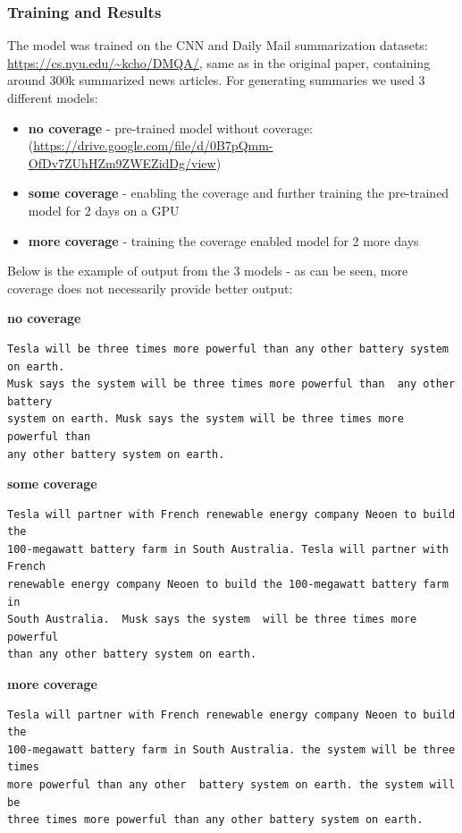 \documentclass[12pt,a4paper]{article}
\begin{document}
\subsubsection{Training and Results}

The model was trained on the CNN and Daily Mail summarization datasets: \\ \mbox{\url{https://cs.nyu.edu/~kcho/DMQA/}}, same as in the original paper, containing around 300k summarized news articles. For generating summaries we used 3 different models:
\begin{itemize}
\item \textbf{no coverage} - pre-trained model without coverage: \\(\mbox{\url{https://drive.google.com/file/d/0B7pQmm-OfDv7ZUhHZm9ZWEZidDg/view}})
\item \textbf{some coverage} - enabling the coverage and further training the pre-trained model for 2 days on a GPU 
\item \textbf{more coverage} - training the coverage enabled model for 2 more days 
\end{itemize}

Below is the example of output from the 3 models - as can be seen, more coverage does not necessarily provide better output: \hfill \break

\textbf{no coverage}

\begin{verbatim}
Tesla will be three times more powerful than any other battery system on earth.  
Musk says the system will be three times more powerful than  any other battery 
system on earth. Musk says the system will be three times more powerful than 
any other battery system on earth.
\end{verbatim}

\textbf{some coverage}
\begin{verbatim}
Tesla will partner with French renewable energy company Neoen to build the 
100-megawatt battery farm in South Australia. Tesla will partner with French
renewable energy company Neoen to build the 100-megawatt battery farm in 
South Australia.  Musk says the system  will be three times more powerful 
than any other battery system on earth.
\end{verbatim}

\textbf{more coverage}
\begin{verbatim}
Tesla will partner with French renewable energy company Neoen to build the 
100-megawatt battery farm in South Australia. the system will be three times 
more powerful than any other  battery system on earth. the system will be 
three times more powerful than any other battery system on earth.
\end{verbatim}
\end{document}
